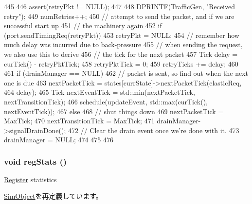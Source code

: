 \begin{DoxyCode}
445 {
446     assert(retryPkt != NULL);
447 
448     DPRINTF(TrafficGen, "Received retry\n");
449     numRetries++;
450     // attempt to send the packet, and if we are successful start up
451     // the machinery again
452     if (port.sendTimingReq(retryPkt)) {
453         retryPkt = NULL;
454         // remember how much delay was incurred due to back-pressure
455         // when sending the request, we also use this to derive
456         // the tick for the next packet
457         Tick delay = curTick() - retryPktTick;
458         retryPktTick = 0;
459         retryTicks += delay;
460 
461         if (drainManager == NULL) {
462             // packet is sent, so find out when the next one is due
463             nextPacketTick = states[currState]->nextPacketTick(elasticReq,
464                                                                delay);
465             Tick nextEventTick = std::min(nextPacketTick, nextTransitionTick);
466             schedule(updateEvent, std::max(curTick(), nextEventTick));
467         } else {
468             // shut things down
469             nextPacketTick = MaxTick;
470             nextTransitionTick = MaxTick;
471             drainManager->signalDrainDone();
472             // Clear the drain event once we're done with it.
473             drainManager = NULL;
474         }
475     }
476 }
\end{DoxyCode}
\hypertarget{classTrafficGen_a4dc637449366fcdfc4e764cdf12d9b11}{
\subsubsection[{regStats}]{\setlength{\rightskip}{0pt plus 5cm}void regStats ()}}
\label{classTrafficGen_a4dc637449366fcdfc4e764cdf12d9b11}
\hyperlink{classRegister}{Register} statistics 

\hyperlink{classSimObject_a4dc637449366fcdfc4e764cdf12d9b11}{SimObject}を再定義しています。


